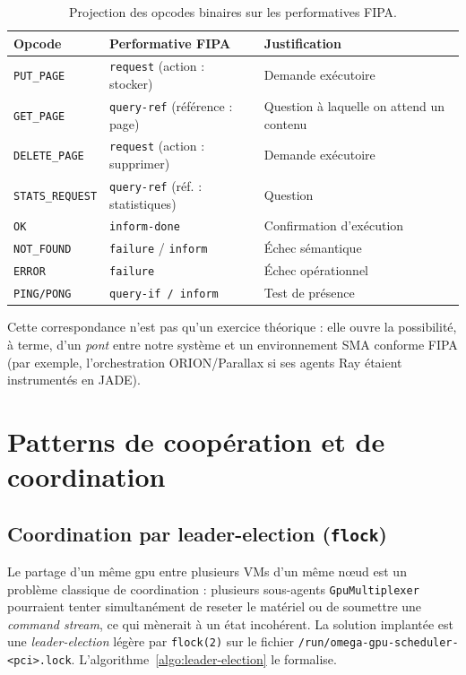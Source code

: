 \begin{table}[H]
\centering
\small
\caption{Projection des opcodes binaires sur les performatives FIPA.}
\begin{tabular}{lll}
\toprule
\textbf{Opcode} & \textbf{Performative FIPA} & \textbf{Justification} \\
\midrule
\texttt{PUT\_PAGE}     & \texttt{request} (action : stocker) & Demande exécutoire \\
\texttt{GET\_PAGE}     & \texttt{query-ref} (référence : page)  & Question à laquelle on attend un contenu \\
\texttt{DELETE\_PAGE}  & \texttt{request} (action : supprimer) & Demande exécutoire \\
\texttt{STATS\_REQUEST} & \texttt{query-ref} (réf. : statistiques) & Question \\
\texttt{OK}            & \texttt{inform-done}                & Confirmation d'exécution \\
\texttt{NOT\_FOUND}    & \texttt{failure} / \texttt{inform}  & Échec sémantique \\
\texttt{ERROR}         & \texttt{failure}                    & Échec opérationnel \\
\texttt{PING/PONG}     & \texttt{query-if / inform}          & Test de présence \\
\bottomrule
\end{tabular}

\label{tab:opcodes-fipa}
\end{table}

Cette correspondance n'est pas qu'un exercice théorique : elle ouvre la possibilité, à terme, d'un \emph{pont} entre notre système et un environnement SMA conforme FIPA (par exemple, l'orchestration ORION/Parallax si ses agents Ray étaient instrumentés en JADE).

\section{Patterns de coopération et de coordination}
\label{sec:sma-patterns}

\subsection{Coordination par leader-election (\texttt{flock})}

Le partage d'un même \acrshort{gpu} entre plusieurs VMs d'un même nœud est un problème classique de coordination : plusieurs sous-agents \texttt{GpuMultiplexer} pourraient tenter simultanément de reseter le matériel ou de soumettre une \emph{command stream}, ce qui mènerait à un état incohérent. La solution implantée est une \emph{leader-election} légère par \texttt{flock(2)} sur le fichier \texttt{/run/omega-gpu-scheduler-<pci>.lock}. L'algorithme~\ref{algo:leader-election} le formalise.

